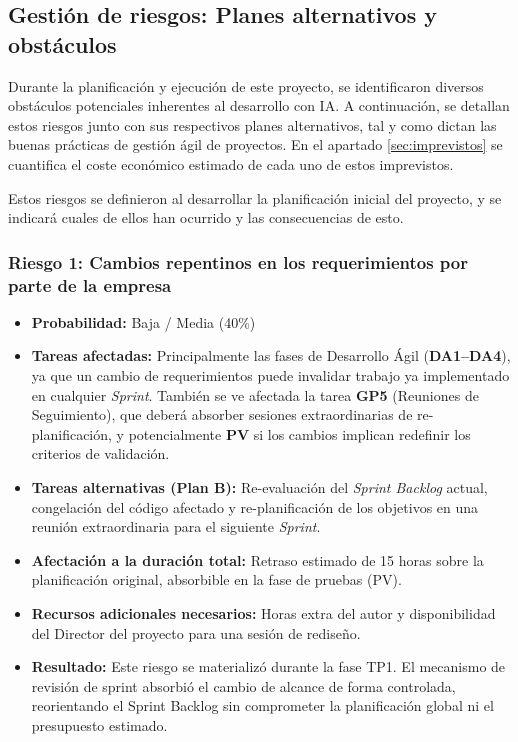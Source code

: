 \documentclass[11pt, letterpaper]{article}
\begin{document}
\subsection{Gestión de riesgos: Planes alternativos y obstáculos}
\label{sec:gestion_riesgos}
Durante la planificación y ejecución de este proyecto, se identificaron diversos obstáculos potenciales inherentes al desarrollo con IA. A continuación, se detallan estos riesgos junto con sus respectivos planes alternativos, tal y como dictan las buenas prácticas de gestión ágil de proyectos. En el apartado \ref{sec:imprevistos} se cuantifica el coste económico estimado de cada uno de estos imprevistos.

Estos riesgos se definieron al desarrollar la planificación inicial del proyecto, y se indicará cuales de ellos han ocurrido y las consecuencias de esto.

\subsubsection{Riesgo 1: Cambios repentinos en los requerimientos por parte de la empresa}
\label{sec:riesgo1}
\begin{itemize}
    \item \textbf{Probabilidad:} Baja / Media (40\%)
    \item \textbf{Tareas afectadas:} Principalmente las fases de Desarrollo Ágil (\textbf{DA1--DA4}), ya que un cambio de requerimientos puede invalidar trabajo ya implementado en cualquier \textit{Sprint}. También se ve afectada la tarea \textbf{GP5} (Reuniones de Seguimiento), que deberá absorber sesiones extraordinarias de re-planificación, y potencialmente \textbf{PV} si los cambios implican redefinir los criterios de validación.
    \item \textbf{Tareas alternativas (Plan B):} Re-evaluación del \textit{Sprint Backlog} actual, congelación del código afectado y re-planificación de los objetivos en una reunión extraordinaria para el siguiente \textit{Sprint}.
    \item \textbf{Afectación a la duración total:} Retraso estimado de 15 horas sobre la planificación original, absorbible en la fase de pruebas (PV).
    \item \textbf{Recursos adicionales necesarios:} Horas extra del autor y disponibilidad del Director del proyecto para una sesión de rediseño.
    \item \textbf{Resultado:} Este riesgo se materializó durante la fase TP1. El mecanismo de revisión de sprint absorbió el cambio de alcance de forma controlada, reorientando el Sprint Backlog sin comprometer la planificación global ni el presupuesto estimado.
\end{itemize}
\end{document}
